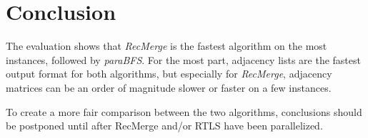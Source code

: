 \documentclass[12pt,a4paper,twoside]{article}
\begin{document}


\section{Conclusion}

The evaluation shows that \emph{RecMerge} is the fastest algorithm on the most instances, followed by \emph{paraBFS}. For the most part, adjacency lists are the fastest output format for both algorithms, but especially for \emph{RecMerge}, adjacency matrices can be an order of magnitude slower or faster on a few instances.

To create a more fair comparison between the two algorithms, conclusions should be postponed until after RecMerge and/or RTLS have been parallelized.



\end{document}
